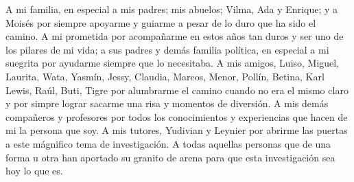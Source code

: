 \begin{acknowledgements}
	A mi familia, en especial a mis padres; mis abuelos; Vilma, Ada y Enrique;  y a Moisés por siempre apoyarme y guiarme a pesar de lo duro que ha sido el camino.
	A mi prometida por acompañarme en estos años tan duros y ser uno de los pilares de mi vida; a sus padres y demás familia política, en especial a mi suegrita por ayudarme siempre que lo necesitaba.
	A mis amigos, Luiso, Miguel, Laurita, Wata, Yasmín, Jessy, Claudia, Marcos, Menor, Pollín, Betina, Karl Lewis, Raúl, Buti, Tigre por alumbrarme el camino cuando no era el mismo claro y por simpre lograr sacarme una risa y  momentos de diversión.  
	A mis demás compañeros y profesores por todos los conocimientos y experiencias que hacen de mi la persona que soy.
	A mis tutores, Yudivian y Leynier por abrirme las puertas a este mágnifico tema de investigación.
	A todas aquellas personas que de una forma u otra han aportado su granito de arena para que esta investigación sea hoy lo que es.
\end{acknowledgements}